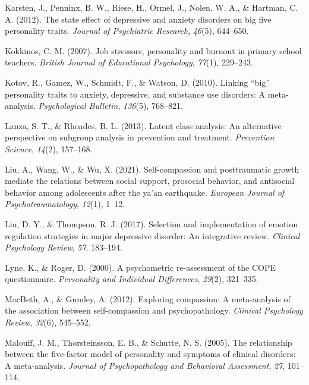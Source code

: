 \documentclass[
  man]{apa7}
\newlength{\cslhangindent}
\newlength{\cslentryspacingunit} %
\newenvironment{CSLReferences}[2] %
 {%
  \setlength{\parindent}{0pt}
  \ifodd #1
  \let\oldpar\par
  \def\par{\hangindent=\cslhangindent\oldpar}
  \fi
  \setlength{\parskip}{#2\cslentryspacingunit}
 }%
 {}
\begin{document}
\begin{CSLReferences}{1}{0}
\leavevmode{}%
Karsten, J., Penninx, B. W., Riese, H., Ormel, J., Nolen, W. A., \& Hartman, C. A. (2012). The state effect of depressive and anxiety disorders on big five personality traits. \emph{Journal of Psychiatric Research}, \emph{46}(5), 644--650.

\leavevmode{}%
Kokkinos, C. M. (2007). Job stressors, personality and burnout in primary school teachers. \emph{British Journal of Educational Psychology}, \emph{77}(1), 229--243.

\leavevmode{}%
Kotov, R., Gamez, W., Schmidt, F., \& Watson, D. (2010). Linking {``big''} personality traits to anxiety, depressive, and substance use disorders: A meta-analysis. \emph{Psychological Bulletin}, \emph{136}(5), 768--821.

\leavevmode{}%
Lanza, S. T., \& Rhoades, B. L. (2013). Latent class analysis: An alternative perspective on subgroup analysis in prevention and treatment. \emph{Prevention Science}, \emph{14}(2), 157--168.

\leavevmode{}%
Liu, A., Wang, W., \& Wu, X. (2021). Self-compassion and posttraumatic growth mediate the relations between social support, prosocial behavior, and antisocial behavior among adolescents after the ya'an earthquake. \emph{European Journal of Psychotraumatology}, \emph{12}(1), 1--12.

\leavevmode{}%
Liu, D. Y., \& Thompson, R. J. (2017). Selection and implementation of emotion regulation strategies in major depressive disorder: An integrative review. \emph{Clinical Psychology Review}, \emph{57}, 183--194.

\leavevmode{}%
Lyne, K., \& Roger, D. (2000). A psychometric re-assessment of the COPE questionnaire. \emph{Personality and Individual Differences}, \emph{29}(2), 321--335.

\leavevmode{}%
MacBeth, A., \& Gumley, A. (2012). Exploring compassion: A meta-analysis of the association between self-compassion and psychopathology. \emph{Clinical Psychology Review}, \emph{32}(6), 545--552.

\leavevmode{}%
Malouff, J. M., Thorsteinsson, E. B., \& Schutte, N. S. (2005). The relationship between the five-factor model of personality and symptoms of clinical disorders: A meta-analysis. \emph{Journal of Psychopathology and Behavioral Assessment}, \emph{27}, 101--114.


\end{CSLReferences}
\end{document}
